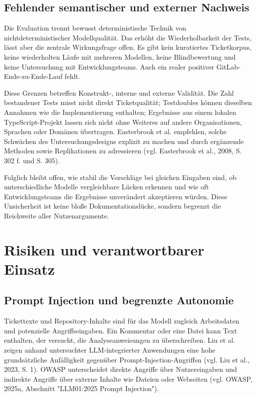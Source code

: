 \subsection{Fehlender semantischer und externer Nachweis}

Die Evaluation trennt bewusst deterministische Technik von nichtdeterministischer Modellqualität. Das erhöht die Wiederholbarkeit der Tests, lässt aber die zentrale Wirkungsfrage offen. Es gibt kein kuratiertes Ticketkorpus, keine wiederholten Läufe mit mehreren Modellen, keine Blindbewertung und keine Untersuchung mit Entwicklungsteams. Auch ein realer positiver GitLab-Ende-zu-Ende-Lauf fehlt.

Diese Grenzen betreffen Konstrukt-, interne und externe Validität. Die Zahl bestandener Tests misst nicht direkt Ticketqualität; Testdoubles können dieselben Annahmen wie die Implementierung enthalten; Ergebnisse aus einem lokalen TypeScript-Projekt lassen sich nicht ohne Weiteres auf andere Organisationen, Sprachen oder Domänen übertragen. Easterbrook et al. empfehlen, solche Schwächen des Untersuchungsdesigns explizit zu machen und durch ergänzende Methoden sowie Replikationen zu adressieren (vgl. Easterbrook et al., 2008, S. 302 f. und S. 305).

Folglich bleibt offen, wie stabil die Vorschläge bei gleichen Eingaben sind, ob unterschiedliche Modelle vergleichbare Lücken erkennen und wie oft Entwicklungsteams die Ergebnisse unverändert akzeptieren würden. Diese Unsicherheit ist keine bloße Dokumentationslücke, sondern begrenzt die Reichweite aller Nutzenargumente.

\section{Risiken und verantwortbarer Einsatz}

\subsection{Prompt Injection und begrenzte Autonomie}

Tickettexte und Repository-Inhalte sind für das Modell zugleich Arbeitsdaten und potenzielle Angriffseingaben. Ein Kommentar oder eine Datei kann Text enthalten, der versucht, die Analyseanweisungen zu überschreiben. Liu et al. zeigen anhand untersuchter LLM-integrierter Anwendungen eine hohe grundsätzliche Anfälligkeit gegenüber Prompt-Injection-Angriffen (vgl. Liu et al., 2023, S. 1). OWASP unterscheidet direkte Angriffe über Nutzereingaben und indirekte Angriffe über externe Inhalte wie Dateien oder Webseiten (vgl. OWASP, 2025a, Abschnitt "LLM01:2025 Prompt Injection").


